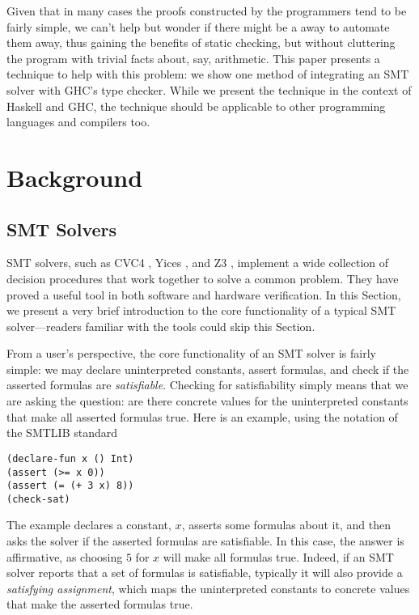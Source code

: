\documentclass{sigplanconf}
\begin{document}
Given that in many cases the proofs constructed by the programmers
tend to be fairly simple, we can't help but wonder if there might
be a away to automate them away, thus gaining the benefits of
static checking, but without cluttering the program with trivial
facts about, say, arithmetic.  This paper presents a technique
to help with this problem: we show one method of integrating
an SMT solver with GHC's type checker.  While we present
the technique in the context of Haskell and GHC, the technique
should be applicable to other programming languages and compilers too.


\section{Background}

\subsection {SMT Solvers}

SMT solvers, such as CVC4 \cite{cvc4}, Yices \cite{yices}, and Z3
\cite{z3}, implement a wide collection of decision procedures that
work together to solve a common problem.  They have proved a useful
tool in both software and hardware verification.  In this Section,
we present a very brief introduction to the core functionality
of a typical SMT solver---readers familiar with the tools could
skip this Section.

From a user's perspective, the core functionality of an SMT solver is fairly
simple: we may declare uninterpreted constants, assert formulas,
and check if the asserted formulas are {\em satisfiable}.  Checking
for satisfiability simply means that we are asking the
question: are there concrete values for the uninterpreted constants
that make all asserted formulas true.  Here is an example, using
the notation of the SMTLIB standard \cite{smtlib2}

\begin{Verbatim}
(declare-fun x () Int)
(assert (>= x 0))
(assert (= (+ 3 x) 8))
(check-sat)
\end{Verbatim}

The example declares a constant, $x$, asserts some formulas
about it, and then asks the solver if the asserted formulas are
satisfiable.  In this case, the answer is affirmative, as choosing
$5$ for $x$ will make all formulas true.  Indeed, if an
SMT solver reports that a set of formulas is satisfiable, typically
it will also provide a {\em satisfying assignment}, which maps
the uninterpreted constants to concrete values that make the
asserted formulas true.
\end{document}
